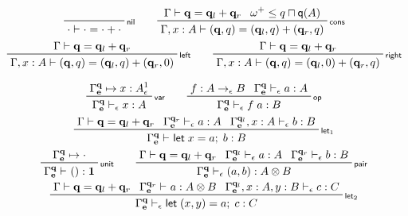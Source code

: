 \documentclass[acmsmall,screen,review]{acmart}
\newcommand{\mb}[1]{\ensuremath{\mathbf{#1}}}
\newcommand{\ms}[1]{\ensuremath{\mathsf{#1}}}
\newcommand{\letexpr}[3]{\ensuremath{\ms{let}\;#1 = #2;\;#3}}
\newcommand{\qsp}[4]{#1 \vdash #2 = #3 + #4}
\newcommand{\cwk}[2]{#1 \mapsto #2}
\newcommand{\rle}[1]{{\scriptsize\textsf{#1}}}
\newcommand{\hasty}[4]{#1 \vdash_{#2} #3: {#4}}
\newcommand{\zeroq}{0}
\newcommand{\oneq}{1}
\newcommand{\cpyq}{\omega^+}
\newcommand{\alquant}{\ms{q}}
\begin{document}

\begin{gather*}
  \prftree[r]{\rle{nil}}
    {\qsp{\cdot}{\cdot}{\cdot}{\cdot}} \qquad
  \prftree[r]{\rle{cons}}
    {\qsp{\Gamma}{\mb{q}}{\mb{q}_l}{\mb{q}_r}}
    {\cpyq \leq q \sqcap \alquant(A)}
    {\qsp{\Gamma, x : A}{(\mb{q}, q)}{(\mb{q}_l, q)}{(\mb{q}_r, q)}}
    \\
  \prftree[r]{\rle{left}}
    {\qsp{\Gamma}{\mb{q}}{\mb{q}_l}{\mb{q}_r}}
    {\qsp{\Gamma, x : A}{(\mb{q}, q)}{(\mb{q}_l, q)}{(\mb{q}_r, \zeroq)}} \qquad
  \prftree[r]{\rle{right}}
    {\qsp{\Gamma}{\mb{q}}{\mb{q}_l}{\mb{q}_r}}
    {\qsp{\Gamma, x : A}{(\mb{q}, q)}{(\mb{q}_l, \zeroq)}{(\mb{q}_r, q)}}
\end{gather*}

\begin{gather*}
  \prftree[r]{\rle{var}}
    {\cwk{\Gamma^{\mb{q}}_{\mb{e}}}{x : A^\oneq_\epsilon}}
      {\hasty{\Gamma^{\mb{q}}_{\mb{e}}}{\epsilon}{x}{A}} 
    \qquad
  \prftree[r]{\rle{op}}{f : A \to_\epsilon B}
    {\hasty{\Gamma^{\mb{q}}_{\mb{e}}}{\epsilon}{a}{A}}
    {\hasty{\Gamma^{\mb{q}}_{\mb{e}}}{\epsilon}{f\;a}{B}} \\
  \prftree[r]{\rle{let$_1$}}{\qsp{\Gamma}{\mb{q}}{\mb{q}_l}{\mb{q}_r}}
    {\hasty{\Gamma^{\mb{q}_r}_{\mb{e}}}{\epsilon}{a}{A}}
    {\hasty{\Gamma^{\mb{q}_l}_{\mb{e}}, x : A}{\epsilon}{b}{B}}
    {\hasty{\Gamma^{\mb{q}}_{\mb{e}}}{}{\letexpr{x}{a}{b}}{B}} \\
  \prftree[r]{\rle{unit}}
    {\cwk{\Gamma^{\mb{q}}_{\mb{e}}}{\cdot}}{\hasty{\Gamma^{\mb{q}}_{\mb{e}}}{}{()}{\mb{1}}} 
    \qquad
  \prftree[r]{\rle{pair}}{\qsp{\Gamma}{\mb{q}}{\mb{q}_l}{\mb{q}_r}}
    {\hasty{\Gamma^{\mb{q}_l}_{\mb{e}}}{\epsilon}{a}{A}}
    {\hasty{\Gamma^{\mb{q}_r}_{\mb{e}}}{\epsilon}{b}{B}}
    {\hasty{\Gamma^{\mb{q}}_{\mb{e}}}{\epsilon}{(a, b)}{A \otimes B}} \\
  \prftree[r]{\rle{let$_2$}}{\qsp{\Gamma}{\mb{q}}{\mb{q}_l}{\mb{q}_r}}
    {\hasty{\Gamma^{\mb{q}_r}_{\mb{e}}}{}{a}{A \otimes B}}
    {\hasty{\Gamma^{\mb{q}_l}_{\mb{e}}, x : A, y : B}{\epsilon}{c}{C}}
    {\hasty{\Gamma^{\mb{q}}_{\mb{e}}}{\epsilon}{\letexpr{(x, y)}{a}{c}}{C}}
\end{gather*}
\end{document}
